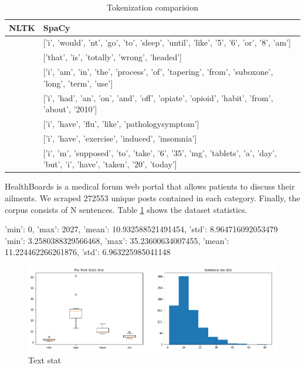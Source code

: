 \documentclass[11pt]{article}
\begin{document}
\begin{center}
\begin{table}
\begin{tabular}{ |p{7cm}|p{7cm}| }
\hline
NLTK & SpaCy \\ \hline
['i', 'wouldnt', 'go', 'to', 'sleep', 'until', 'like', '5', '6', 'or', '8am'] & 
['i', 'would', 'nt', 'go', 'to', 'sleep', 'until', 'like', '5', '6', 'or', '8', 'am'] \\ \hline
['that', 'is', 'totally', 'wrongheaded'] & ['that', 'is', 'totally', 'wrong', 'headed'] \\ \hline
['i', 'am', 'in', 'the', 'process', 'of', 'tapering', 'from', 'suboxone', 'longterm', 'use'] & 
['i', 'am', 'in', 'the', 'process', 'of', 'tapering', 'from', 'suboxone', 'long', 'term', 'use'] \\ \hline
['i', 'had', 'an', 'onandoff', 'opiateopioid', 'habit', 'from', 'about', '2010'] & 
['i', 'had', 'an', 'on', 'and', 'off', 'opiate', 'opioid', 'habit', 'from', 'about', '2010'] \\ 
\hline
['i', 'have', 'flulike', 'pathologysymptom'] & ['i', 'have', 'flu', 'like', 'pathologysymptom'] \\ \hline
['i', 'have', 'exerciseinduced', 'insomnia'] & ['i', 'have', 'exercise', 'induced', 'insomnia'] \\ \hline
['i', 'm', 'supposed', 'to', 'take', '6', '35mg', 'tablets', 'a', 'day', 'but', 'i', 'have', 'taken', '20', 'today'] & 
['i', 'm', 'supposed', 'to', 'take', '6', '35', 'mg', 'tablets', 'a', 'day', 'but', 'i', 'have', 'taken', '20', 'today'] \\ 
\hline
\end{tabular}	
\caption{\label{token_dif}Tokenization comparision}
\end{table}
\end{center}



HealthBoards is a medical forum web portal that allows patients to discuss their ailments.
We scraped 272553 unique posts contained in each category. Finally, the corpus consists of N  sentences. Table \ref{visina8} shows the dataset statistics.


{'min': 0, 'max': 2027, 'mean': 10.932588521491454, 'std': 8.964716092053479}
{'min': 3.2580388329566468, 'max': 35.23600634007455, 'mean': 11.224462266261876, 'std': 6.963225985041148}


 \begin{figure}[h]
 	\centering
 	\includegraphics[scale=0.5]{report3.png}
	\caption{Text stat}\label{visina8}
 \end{figure}
\end{document}
